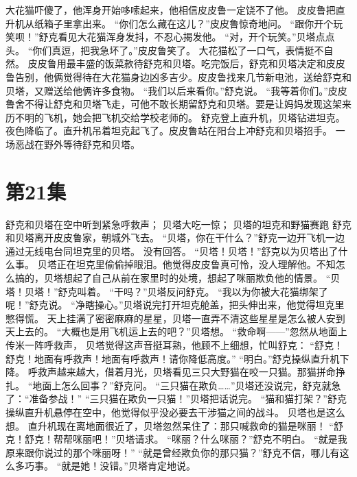 \documentclass[a4paper,12pt,UTF8,twoside]{ctexbook}
\begin{document}
        大花猫吓傻了，他浑身开始哆嗦起来，他相信皮皮鲁一定饶不了他。 
        皮皮鲁把直升机从纸箱子里拿出来。 
        “你们怎么藏在这儿？”皮皮鲁惊奇地问。 
        “跟你开个玩笑呗！”舒克看见大花猫浑身发抖，不忍心揭发他。 
        “对，开个玩笑。”贝塔点点头。 
        “你们真逗，把我急坏了。”皮皮鲁笑了。 
        大花猫松了一口气，表情挺不自然。 
        皮皮鲁用最丰盛的饭菜款待舒克和贝塔。吃完饭后，舒克和贝塔决定和皮皮鲁告别，他俩觉得待在大花猫身边凶多吉少。皮皮鲁找来几节新电池，送给舒克和贝塔，又赠送给他俩许多食物。 
        “我们以后来看你。”舒克说。 
        “我等着你们。”皮皮鲁舍不得让舒克和贝塔飞走，可他不敢长期留舒克和贝塔。要是让妈妈发现这架来历不明的飞机，她会把飞机交给学校老师的。 
        舒克登上直升机，贝塔钻进坦克。 
        夜色降临了。直升机吊着坦克起飞了。皮皮鲁站在阳台上冲舒克和贝塔招手。 
        一场恶战在野外等待舒克和贝塔。   \chapter{第21集} 
        舒克和贝塔在空中听到紧急呼救声； 
        贝塔大吃一惊； 
        贝塔的坦克和野猫赛跑   
        舒克和贝塔离开皮皮鲁家，朝城外飞去。 
        “贝塔，你在干什么？”舒克一边开飞机一边通过无线电台同坦克里的贝塔。 
        没有回答。 
        “贝塔！贝塔！”舒克以为贝塔出了什么事。 
        贝塔正在坦克里偷偷掉眼泪。他觉得皮皮鲁真可怜，没人理解他。不知怎么搞的，贝塔想起了自己从前在家里时的处境，想起了咪丽欺负他的情景。 
        “贝塔！贝塔！”舒克叫着。 
        “干吗？”贝塔反问舒克。 
        “我以为你被大花猫绑架了呢！”舒克说。 
        “净瞎操心。”贝塔说完打开坦克舱盖，把头伸出来，他觉得坦克里憋得慌。 
        天上挂满了密密麻麻的星星，贝塔一直弄不清这些星星是怎么被人安到天上去的。 
        “大概也是用飞机运上去的吧？”贝塔想。 
        “救命啊——”忽然从地面上传米一阵呼救声， 
        贝塔觉得这声音挺耳熟，他顾不上细想，忙叫舒克： 
        “舒克！舒克！地面有呼救声！地面有呼救声！请你降低高度。” 
        “明白。”舒克操纵直升机下降。 
        呼救声越来越大，借着月光，贝塔看见三只大野猫在咬一只猫。那猫拼命挣扎。 
        “地面上怎么回事？”舒克问。 
        “三只猫在欺负……”贝塔还没说完，舒克就急了：“准备参战！” 
        “三只猫在欺负一只猫！”贝塔把话说完。 
        “猫和猫打架？”舒克操纵直升机悬停在空中，他觉得似乎没必要去干涉猫之间的战斗。 
        贝塔也是这么想。 
        直升机现在离地面很近了，贝塔忽然呆住了：那只喊救命的猫是咪丽！ 
        “舒克！舒克！帮帮咪丽吧！”贝塔请求。 
        “咪丽？什么咪丽？”舒克不明白。 
        “就是我原来跟你说过的那个咪丽呀！” 
        “就是曾经欺负你的那只猫？”舒克不信，哪儿有这么多巧事。 
        “就是她！没错。”贝塔肯定地说。 
\end{document}
